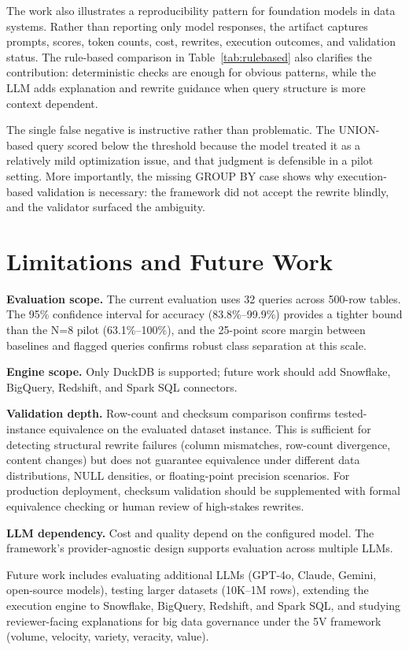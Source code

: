 \documentclass[conference]{IEEEtran}
\begin{document}
The work also illustrates a reproducibility pattern for foundation models in data systems. Rather than reporting only model responses, the artifact captures prompts, scores, token counts, cost, rewrites, execution outcomes, and validation status. The rule-based comparison in Table~\ref{tab:rulebased} also clarifies the contribution: deterministic checks are enough for obvious patterns, while the LLM adds explanation and rewrite guidance when query structure is more context dependent.

The single false negative is instructive rather than problematic. The UNION-based query scored below the threshold because the model treated it as a relatively mild optimization issue, and that judgment is defensible in a pilot setting. More importantly, the missing GROUP BY case shows why execution-based validation is necessary: the framework did not accept the rewrite blindly, and the validator surfaced the ambiguity.

\section{Limitations and Future Work}
\label{sec:limitations}
\textbf{Evaluation scope.} The current evaluation uses 32 queries across 500-row tables. The 95\% confidence interval for accuracy (83.8\%--99.9\%) provides a tighter bound than the N=8 pilot (63.1\%--100\%), and the 25-point score margin between baselines and flagged queries confirms robust class separation at this scale.

\textbf{Engine scope.} Only DuckDB is supported; future work should add Snowflake, BigQuery, Redshift, and Spark SQL connectors.

\textbf{Validation depth.} Row-count and checksum comparison confirms tested-instance equivalence on the evaluated dataset instance. This is sufficient for detecting structural rewrite failures (column mismatches, row-count divergence, content changes) but does not guarantee equivalence under different data distributions, NULL densities, or floating-point precision scenarios. For production deployment, checksum validation should be supplemented with formal equivalence checking or human review of high-stakes rewrites.

\textbf{LLM dependency.} Cost and quality depend on the configured model. The framework's provider-agnostic design supports evaluation across multiple LLMs.

Future work includes evaluating additional LLMs (GPT-4o, Claude, Gemini, open-source models), testing larger datasets (10K--1M rows), extending the execution engine to Snowflake, BigQuery, Redshift, and Spark SQL, and studying reviewer-facing explanations for big data governance under the 5V framework (volume, velocity, variety, veracity, value).
\end{document}

